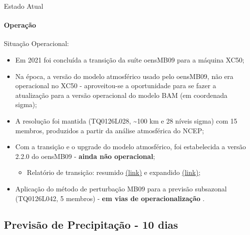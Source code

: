 \documentclass[10pt,aspectratio=169]{beamer}
\begin{document}
\begin{frame}{Estado Atual}
	\framesubtitle{Operação}
    \begin{block}{Situação Operacional:}
    	\begin{itemize}
    		\item Em 2021 foi concluída a transição da suíte oensMB09 para a máquina XC50;
    		\pause
			\item Na época, a versão do modelo atmosférico usado pelo oensMB09, não era operacional no XC50 - aproveitou-se a oportunidade para se fazer a atualização para a versão operacional do modelo BAM (em coordenada sigma);
			\pause
			\item A resolução foi mantida (TQ0126L028, \textasciitilde100 km e 28 níveis sigma) com 15 membros, produzidos a partir da análise atmosférica do NCEP;
			\pause
			\item Com a transição e o upgrade do modelo atmosférico, foi estabelecida a versão 2.2.0 \cite{figueroaetal/2016} do oensMB09 - \textbf{ainda não operacional};
			\begin{itemize}
				\item Relatório de transição: resumido \href{https://s0.cptec.inpe.br/webcptec/sites/dmd/Avalia\%C3\%A7\%C3\%A3o-Modelo-Ensemble-Global-v1.1-2021.pdf}{(\faFile[regular] link)} e expandido \href{https://www.dropbox.com/s/je8q92jpwzc1bnz/16.\%20Relat\%C3\%B3rio\%20-\%20Bastarz\%20et\%20al.\%2C\%202021.pdf?dl=0}{(\faFile[regular] link)};
			\end{itemize}
			\item Aplicação do método de perturbação MB09 para a previsão subsazonal (TQ0126L042, 5 membros) - \textbf{em vias de operacionalização} \cite{guimaraes/2020, guimaraes/2021}.
    	\end{itemize}
    \end{block}
\end{frame}

\subsection{Previsão de Precipitação - 10 dias}
\end{document}
